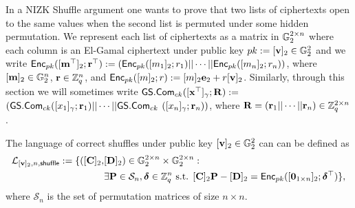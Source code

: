 In a NIZK Shuffle argument one wants to prove that two lists of ciphertexts open to the same values when the second list is permuted under some hidden permutation.
We represent each list of ciphertexts as a matrix in $\mathbb{G}_2^{2\times n}$ where each column is an El-Gamal ciphertext under public key $pk:=[\mathbf{v}]_2\in\mathbb{G}^2_2$ and we write $\mathsf{Enc}_{pk}([\mathbf{m}^\top]_2;\mathbf{r}^\top):=(\mathsf{Enc}_{pk}([m_1]_2;r_1)||\cdots||\mathsf{Enc}_{pk}([m_n]_2;r_n))$, where $[\mathbf{m}]_2\in\mathbb{G}_2^n$, $\mathbf{r}\in\mathbb{Z}_q^n$, and $\mathsf{Enc}_{pk}([m]_2;r):=[m]_2\mathbf{e}_2+r[\mathbf{v}]_2$. Similarly, through this section we will sometimes write ${\mathsf{GS}}.\mathsf{Com}_{ck}([\mathbf{x}^\top]_\gamma;\mathbf{{R}}):=$\-$({\mathsf{GS}}.\mathsf{Com}_{ck}([x_1]_\gamma;\mathbf{r}_1)||\cdots||{\mathsf{GS}}.\mathsf{Com}_{ck}$ $([x_n]_\gamma;\mathbf{r}_n))$, where $\mathbf{{R}}=(\mathbf{r}_1||\cdots||\mathbf{r}_n)\in\mathbb{Z}_q^{2\times n}$.

The language of correct shuffles under public key $[\mathbf{v}]_2\in\mathbb{G}^2_2$ can can be defined as 
\begin{align*}
\mathcal{L}_{[\mathbf{v}]_2,n,\mathsf{shuffle}}:=\{([\mathbf{{C}}]_2,&[\mathbf{{D}}]_2)\in\mathbb{G}_2^{2\times n}\times \mathbb{G}_2^{2\times n} :\\
                                                         &\exists \mathbf{{P}}\in\mathcal{S}_n,{\boldsymbol \delta}\in\mathbb{Z}_q^n \text{ s.t. } {[\mathbf{{C}}]_2\mathbf{{P}}-[\mathbf{{D}}]_2 = \mathsf{Enc}_{pk}([\mathbf{0}_{1\times n}]_2;{\boldsymbol \delta}^\top)}\},
\end{align*}
where $\mathcal{S}_n$ is the set of permutation matrices of size $n\times n$. %

 
